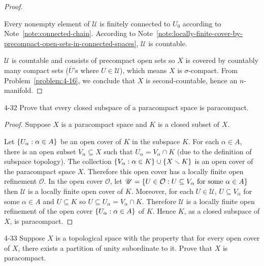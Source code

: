 \begin{proof}
\begin{enumerate}[label={(\alph*)}]
		      Every nonempty element of $\mathscr{U}$ is finitely connected to $U_{0}$ according to Note~\ref{note:connected-chain}. According to Note~\ref{note:locally-finite-cover-by-precompact-open-sets-in-connected-spaces}, $\mathscr{U}$ is countable.
	\end{enumerate}

	$\mathscr{U}$ is countable and consists of precompact open sets so $X$ is covered by countably many compact sets ($\overline{U}$'s where $U \in \mathscr{U}$), which means $X$ is $\sigma$-compact. From Problem~\ref{problem:4-16}, we conclude that $X$ is second-countable, hence an $n$-manifold.
\end{proof}

\begin{problem}{4-32}\label{problem:4-32}
Prove that every closed subspace of a paracompact space is paracompact.
\end{problem}

\begin{proof}
	Suppose $X$ is a paracompact space and $K$ is a closed subset of $X$.

	Let $\left\{{ U_{\alpha}: \alpha\in A }\right\}$ be an open cover of $K$ in the subspace $K$. For each $\alpha\in A$, there is an open subset $V_{\alpha}\subseteq X$ such that $U_{\alpha} = V_{\alpha}\cap K$ (due to the definition of subspace topology). The collection $\left\{{ V_{\alpha} : \alpha\in K }\right\} \cup \left\{{ X\smallsetminus K }\right\}$ is an open cover of the paracompact space $X$. Therefore this open cover has a locally finite open refinement $\mathcal{O}$. In the open cover $\mathcal{O}$, let $\mathscr{U} = \left\{{ U \in \mathcal{O} : \text{$U \subseteq V_{\alpha}$ for some $\alpha\in A$} }\right\}$ then $\mathscr{U}$ is a locally finite open cover of $K$. Moreover, for each $U\in \mathscr{U}$, $U \subseteq V_{\alpha}$ for some $\alpha\in A$ and $U\subseteq K$ so $U \subseteq U_{\alpha} = V_{\alpha}\cap K$. Therefore $\mathscr{U}$ is a locally finite open refinement of the open cover $\left\{{ U_{\alpha}: \alpha\in A }\right\}$ of $K$. Hence $K$, as a closed subspace of $X$, is paracompact.
\end{proof}

\begin{problem}{4-33}\label{problem:4-33}
Suppose $X$ is a topological space with the property that for every open cover of $X$, there exists a partition of unity subordinate to it. Prove that $X$ is paracompact.
\end{problem}

